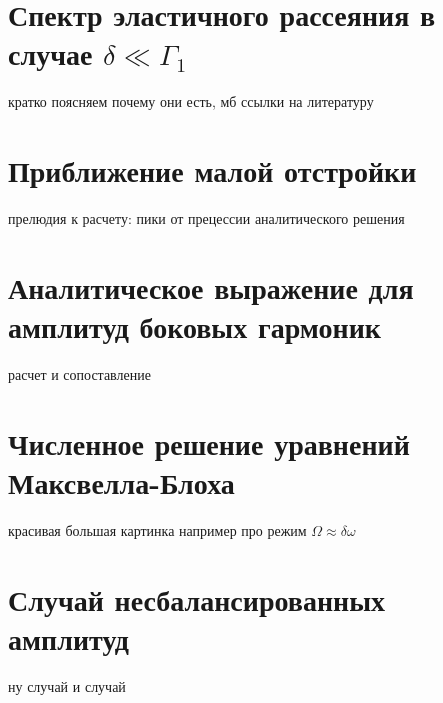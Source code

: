\section{Спектр эластичного рассеяния в случае $\delta \ll \Gamma_1$}
кратко поясняем почему они есть, мб ссылки на литературу
\section{Приближение малой отстройки}
прелюдия к расчету: пики от прецессии аналитического решения
\section{Аналитическое выражение для амплитуд боковых гармоник}
расчет и сопоставление
\section{Численное решение уравнений Максвелла-Блоха}
красивая большая картинка например про режим $\Omega \approx \delta \omega$
\section{Случай несбалансированных амплитуд}
 ну случай и случай